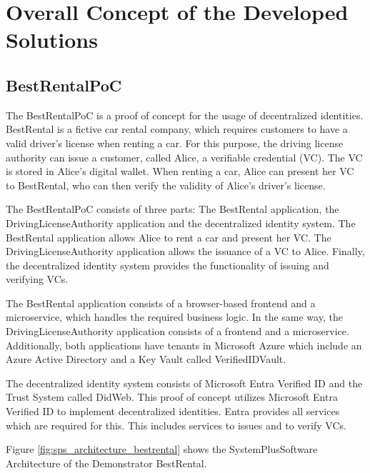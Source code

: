 \chapter{Overall Concept of the Developed Solutions}



\section{BestRentalPoC}

The BestRentalPoC is a proof of concept for the usage of decentralized identities.
BestRental is a fictive car rental company, which requires customers to have a valid driver's license
when renting a car.
For this purpose, the driving license authority can issue a customer, called Alice, a verifiable credential (VC).
The VC is stored in Alice's digital wallet.
When renting a car, Alice can present her VC to BestRental, who can then verify the validity of Alice's driver's license.

The BestRentalPoC consists of three parts: The BestRental application, the DrivingLicenseAuthority application
and the decentralized identity system.
The BestRental application allows Alice to rent a car and present her VC.
The DrivingLicenseAuthority application allows the issuance of a VC to Alice.
Finally, the decentralized identity system provides the functionality of issuing and verifying VCs.

The BestRental application consists of a browser-based frontend and a microservice, which handles the required
business logic. In the same way, the DrivingLicenseAuthority application consists of a frontend and a microservice.
Additionally, both applications have tenants in Microsoft Azure which include an Azure Active Directory and
a Key Vault called VerifiedIDVault.

The decentralized identity system consists of Microsoft Entra Verified ID and the Trust System called DidWeb.
This proof of concept utilizes Microsoft Entra Verified ID to implement decentralized identities.
Entra provides all services which are required for this. This includes services to issues and to verify VCs.

Figure \ref{fig:sps_architecture_bestrental} shows the SystemPlusSoftware Architecture of the Demonstrator BestRental.

